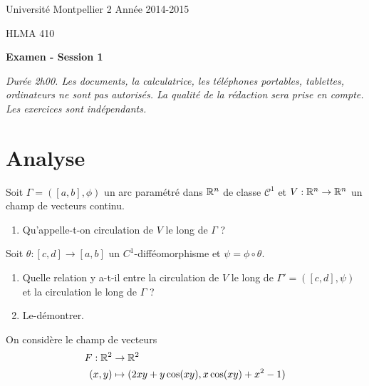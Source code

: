 \documentclass{article}
\begin{document}
\noindent Université Montpellier 2 \hfill Année 2014-2015

\noindent HLMA 410
 


\bigskip

\begin{center}
{\large \sffamily\bfseries Examen - Session 1}
\end{center}

\textit{Durée 2h00. Les documents, la calculatrice, les téléphones portables, tablettes, ordinateurs ne sont pas autorisés. La qualité de la rédaction sera prise en compte. Les exercices sont indépendants.} 

\bigskip
\bigskip

\section{Analyse}

	Soit $\Gamma=([a,b],\phi)$ un arc param\'etr\'e dans $\mathbb{R}^n$ de classe $\mathcal C^1$ et $V:\mathbb{R}^n \rightarrow \mathbb{R}^n$ un champ de vecteurs continu.
\begin{enumerate}
	\item Qu'appelle-t-on circulation de $V$ le long de $\Gamma$ ?
\end{enumerate}
			Soit $\theta: [c,d] \rightarrow [a,b]$ un $C^1$-diff\'eomorphisme et $\psi=\phi \circ \theta$. 
		\begin{enumerate}[resume]
	\item Quelle relation y a-t-il entre la circulation de $V$ le long de $\Gamma'=([c,d],\psi)$ et la circulation le long de $\Gamma$ ? 	\item Le-d\'emontrer.
\end{enumerate}

\bigskip


\exo{} On considère le champ de vecteurs 
\begin{align*}
	F: \mathbb{R}^2 & \to \mathbb{R}^2 \\
	(x,y) & \mapsto (2xy+y\cos(xy), x\cos(xy) +x^2-1)
\end{align*}
\end{document}
